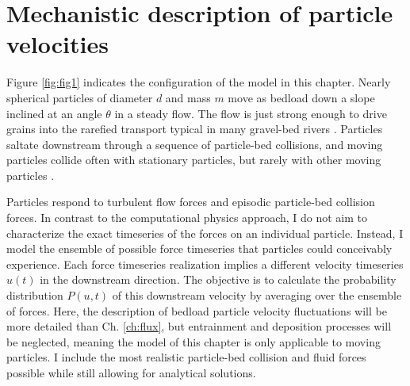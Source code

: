 \section{Mechanistic description of particle velocities}
\label{sec:langmodel}

Figure \ref{fig:fig1} indicates the configuration of the model in this chapter.
Nearly spherical particles of diameter $d$ and mass $m$ move as bedload down a slope inclined at an angle $\theta$ in a steady flow.
The flow is just strong enough to drive grains into the rarefied transport typical in many gravel-bed rivers \citep[e.g.][]{Ashworth1989, Warburton1992}. Particles saltate downstream through a sequence of particle-bed collisions, and moving particles collide often with stationary particles, but rarely with other moving particles \citep[cf.][]{Williams2021}.

Particles respond to turbulent flow forces and episodic particle-bed collision forces. In contrast to the computational physics approach, I do not aim to characterize the exact timeseries of the forces on an individual particle. Instead, I model the ensemble of possible force timeseries that particles could conceivably experience. Each force timeseries realization implies a different velocity timeseries $u(t)$ in the downstream direction.
The objective is to calculate the probability distribution $P(u,t)$ of this downstream velocity by averaging over the ensemble of forces.
Here, the description of bedload particle velocity fluctuations will be more detailed than Ch. \ref{ch:flux}, but entrainment and deposition processes will be neglected, meaning the model of this chapter is only applicable to moving particles.
I include the most realistic particle-bed collision and fluid forces possible while still allowing for analytical solutions.

